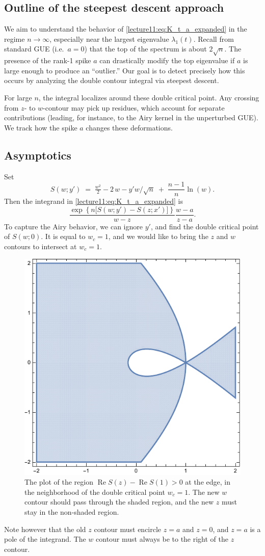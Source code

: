\documentclass[letterpaper,11pt,oneside,reqno]{book}
\numberwithin{equation}{chapter}  %
\theoremstyle{definition}
\begin{document}
\subsection{Outline of the steepest descent approach}

We aim to understand the behavior of
\eqref{lecture11:eq:K_t_a_expanded} in the regime $n\to\infty$, especially near the largest eigenvalue $\lambda_1(t)$.  Recall from standard GUE (i.e.\ $a=0$) that the top of the spectrum is about $2\sqrt{n}$.  The presence of the rank-1 spike $a$ can drastically modify the top eigenvalue if $a$ is large enough to produce an ``outlier.''  Our goal is to detect precisely how this occurs by analyzing the double contour integral via steepest descent.

For large $n$, the integral localizes around these
double critical point.
Any crossing from $z$- to $w$-contour may pick up residues, which account for separate contributions (leading, for instance, to the Airy kernel in the unperturbed GUE).
We track how the spike $a$ changes these deformations.

\subsection{Asymptotics}

Set
\[
S(w;y')\;=\;
\tfrac{w^2}{2}-2\,w-y' w/\sqrt n
\;+\;
\frac{n-1}{n}\ln(w).
\]
Then the integrand in \eqref{lecture11:eq:K_t_a_expanded} is
\[
	\frac{\exp\left\{ n\bigl[S(w;y')-S(z;x')\bigr] \right\}}{w-z}\frac{w-a}{z-a}.
\]
To capture the Airy behavior, we can ignore $y'$, and find the double critical
point of $S(w;0)$. It is equal to $w_c=1$,
and we would like to bring the $z$ and $w$ contours to intersect at $w_c=1$.
\begin{figure}[htpb]
    \centering
    \includegraphics[height=.3\textwidth]{pictures/ReS_edge.pdf}
    \caption{The plot of the region $\operatorname{Re}S(z)-\operatorname{Re}S(1)>0$
			at the edge, in the neighborhood of the double critical point $w_c=1$.
			The new $w$ contour should pass through the shaded region,
		and the new $z$ must stay in the non-shaded region.}
    \label{lecture11:fig:ReS_edge}
\end{figure}
Note however that the old $z$ contour must encircle $z=a$ and $z=0$,
and $z=a$ is a pole of the integrand. The $w$ contour must always be to the right of
the $z$ contour.
\end{document}
